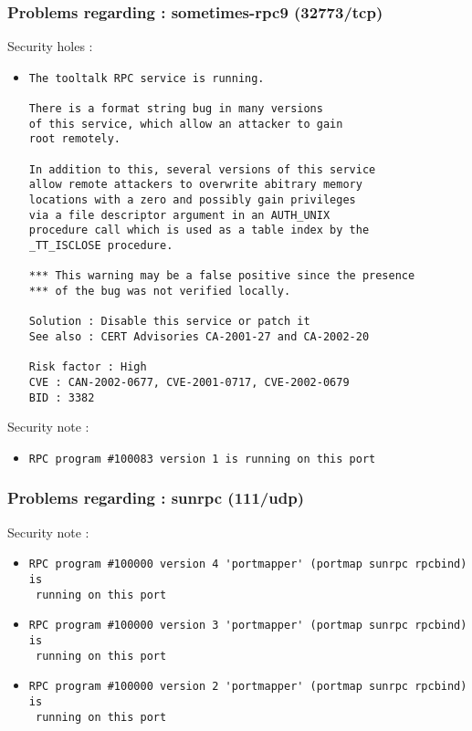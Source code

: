 \documentclass{article}
\begin{document}
\subsubsection{Problems regarding : sometimes-rpc9 (32773/tcp)}
Security holes :\\
\begin{itemize}
\item \begin{verbatim}
The tooltalk RPC service is running.

There is a format string bug in many versions
of this service, which allow an attacker to gain
root remotely.

In addition to this, several versions of this service
allow remote attackers to overwrite abitrary memory
locations with a zero and possibly gain privileges
via a file descriptor argument in an AUTH_UNIX 
procedure call which is used as a table index by the
_TT_ISCLOSE procedure.

*** This warning may be a false positive since the presence
*** of the bug was not verified locally.
    
Solution : Disable this service or patch it
See also : CERT Advisories CA-2001-27 and CA-2002-20

Risk factor : High
CVE : CAN-2002-0677, CVE-2001-0717, CVE-2002-0679
BID : 3382
\end{verbatim}\end{itemize}
Security note :\\
\begin{itemize}
\item \begin{verbatim}
RPC program #100083 version 1 is running on this port
\end{verbatim}\end{itemize}
\subsubsection{Problems regarding : sunrpc (111/udp)}
Security note :\\
\begin{itemize}
\item \begin{verbatim}
RPC program #100000 version 4 'portmapper' (portmap sunrpc rpcbind) is
 running on this port
\end{verbatim}\item \begin{verbatim}
RPC program #100000 version 3 'portmapper' (portmap sunrpc rpcbind) is
 running on this port
\end{verbatim}\item \begin{verbatim}
RPC program #100000 version 2 'portmapper' (portmap sunrpc rpcbind) is
 running on this port
\end{verbatim}\end{itemize}
\end{document}
